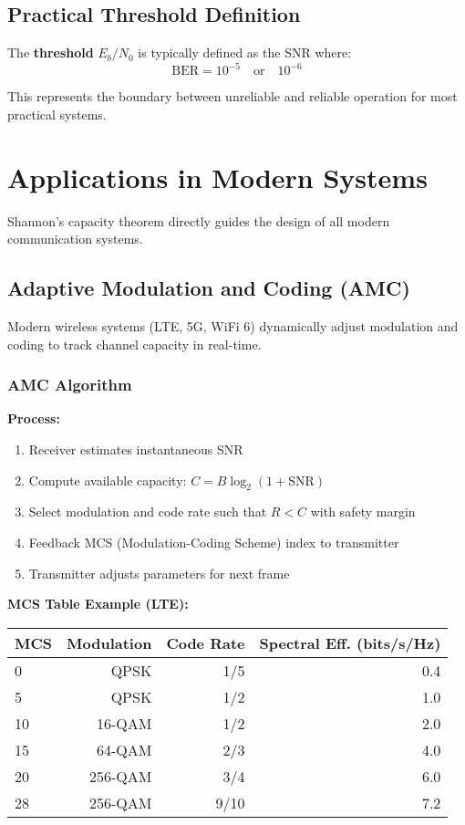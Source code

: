 \subsection{Practical Threshold Definition}

The \textbf{threshold} $E_b/N_0$ is typically defined as the SNR where:
\begin{equation}
\mathrm{BER} = 10^{-5} \quad \text{or} \quad 10^{-6}
\end{equation}

This represents the boundary between unreliable and reliable operation for most practical systems.

\section{Applications in Modern Systems}

Shannon's capacity theorem directly guides the design of all modern communication systems.

\subsection{Adaptive Modulation and Coding (AMC)}

Modern wireless systems (LTE, 5G, WiFi 6) dynamically adjust modulation and coding to track channel capacity in real-time.

\subsubsection{AMC Algorithm}

\textbf{Process:}
\begin{enumerate}
\item Receiver estimates instantaneous SNR
\item Compute available capacity: $C = B \log_2(1 + \mathrm{SNR})$
\item Select modulation and code rate such that $R < C$ with safety margin
\item Feedback MCS (Modulation-Coding Scheme) index to transmitter
\item Transmitter adjusts parameters for next frame
\end{enumerate}

\textbf{MCS Table Example (LTE):}

\begin{center}
\begin{tabular}{@{}lrrr@{}}
\toprule
MCS & Modulation & Code Rate & Spectral Eff. (bits/s/Hz) \\
\midrule
0 & QPSK & 1/5 & 0.4 \\
5 & QPSK & 1/2 & 1.0 \\
10 & 16-QAM & 1/2 & 2.0 \\
15 & 64-QAM & 2/3 & 4.0 \\
20 & 256-QAM & 3/4 & 6.0 \\
28 & 256-QAM & 9/10 & 7.2 \\
\bottomrule
\end{tabular}
\end{center}

